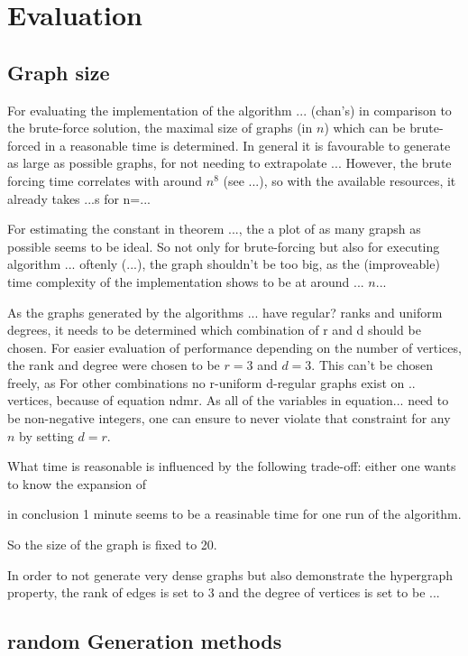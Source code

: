 \chapter{Evaluation}\label{chapter:Evaluation}

\section{Graph size}
For evaluating the implementation of the algorithm ... (chan's) in comparison to the brute-force solution, the maximal size of graphs (in $n$) which can be brute-forced in a reasonable time is determined. In general it is favourable to generate as large as possible graphs, for not needing to extrapolate ...
However, the brute forcing time correlates with around $n^8$ (see ...), so with the available resources, it already takes ...s for n=...

For estimating the constant in theorem ..., the a plot of as many grapsh as possible seems to be ideal. So not only for brute-forcing but also for executing algorithm ... oftenly (...), the graph shouldn't be too big, as the (improveable) time complexity of the implementation shows to be at around ... $n...$

As the graphs generated by the algorithms ... have regular? ranks and uniform degrees, it needs to be determined which combination of r and d should be chosen.
For easier evaluation of performance depending on the number of vertices, the rank and degree were chosen to be $r=3$ and $d=3$.
This can't be chosen freely, as For other combinations no r-uniform d-regular graphs exist on .. vertices, because of equation ndmr. 
As all of the variables in equation... need to be non-negative integers, one can ensure to never violate that constraint for any $n$ by setting $d=r$. 



What time is reasonable is influenced by the following trade-off: either one wants to know the expansion of  

in conclusion 1 minute seems to be a reasinable time for one run of the algorithm.


So the size of the graph is fixed to 20.




In order to not generate very dense graphs but also demonstrate the hypergraph property, the rank of edges is set to 3 and the degree of vertices is set to be ... 




\section{random Generation methods}

